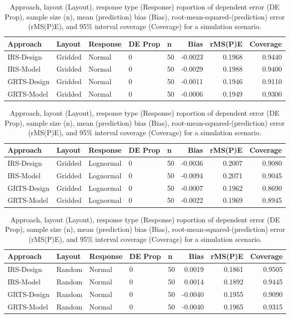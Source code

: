 \documentclass[]{elsarticle} %
\begin{document}
\begin{table}[ht]
\centering
\begin{tabular}{lllllrrr}
  \hline
Approach & Layout & Response & DE Prop & n & Bias & rMS(P)E & Coverage \\ 
  \hline
IRS-Design & Gridded & Normal & 0 & 50 & -0.0023 & 0.1968 & 0.9440 \\ 
  IRS-Model & Gridded & Normal & 0 & 50 & -0.0029 & 0.1988 & 0.9400 \\ 
  GRTS-Design & Gridded & Normal & 0 & 50 & -0.0011 & 0.1946 & 0.9110 \\ 
  GRTS-Model & Gridded & Normal & 0 & 50 & -0.0006 & 0.1949 & 0.9300 \\ 
   \hline
\end{tabular}
\caption{Approach, layout (Layout), response type (Response) roportion of dependent error (DE Prop), sample size (n), mean (prediction) bias (Bias), root-mean-squared-(prediction) error (rMS(P)E), and 95\% interval coverage (Coverage) for a simulation scenario.} 
\end{table}
\begin{table}[ht]
\centering
\begin{tabular}{lllllrrr}
  \hline
Approach & Layout & Response & DE Prop & n & Bias & rMS(P)E & Coverage \\ 
  \hline
IRS-Design & Gridded & Lognormal & 0 & 50 & -0.0036 & 0.2007 & 0.9080 \\ 
  IRS-Model & Gridded & Lognormal & 0 & 50 & -0.0094 & 0.2071 & 0.9045 \\ 
  GRTS-Design & Gridded & Lognormal & 0 & 50 & -0.0007 & 0.1962 & 0.8690 \\ 
  GRTS-Model & Gridded & Lognormal & 0 & 50 & -0.0022 & 0.1969 & 0.8945 \\ 
   \hline
\end{tabular}
\caption{Approach, layout (Layout), response type (Response) roportion of dependent error (DE Prop), sample size (n), mean (prediction) bias (Bias), root-mean-squared-(prediction) error (rMS(P)E), and 95\% interval coverage (Coverage) for a simulation scenario.} 
\end{table}
\begin{table}[ht]
\centering
\begin{tabular}{lllllrrr}
  \hline
Approach & Layout & Response & DE Prop & n & Bias & rMS(P)E & Coverage \\ 
  \hline
IRS-Design & Random & Normal & 0 & 50 & 0.0019 & 0.1861 & 0.9505 \\ 
  IRS-Model & Random & Normal & 0 & 50 & 0.0014 & 0.1892 & 0.9445 \\ 
  GRTS-Design & Random & Normal & 0 & 50 & -0.0040 & 0.1955 & 0.9090 \\ 
  GRTS-Model & Random & Normal & 0 & 50 & -0.0040 & 0.1965 & 0.9315 \\ 
   \hline
\end{tabular}
\caption{Approach, layout (Layout), response type (Response) roportion of dependent error (DE Prop), sample size (n), mean (prediction) bias (Bias), root-mean-squared-(prediction) error (rMS(P)E), and 95\% interval coverage (Coverage) for a simulation scenario.} 
\end{table}
\end{document}
